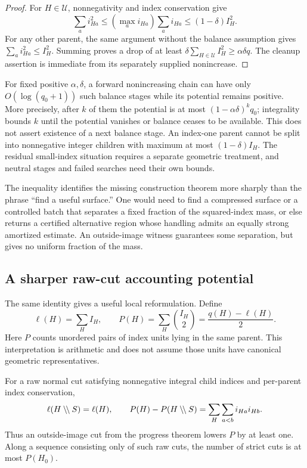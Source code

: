 \begin{proof}
For $H\in\mathcal U$, nonnegativity and index conservation give
\[
 \sum_a i_{Ha}^2\le (\max_a i_{Ha})\sum_a i_{Ha}
 \le(1-\delta)I_H^2.
\]
For any other parent, the same argument without the balance assumption
gives $\sum_a i_{Ha}^2\le I_H^2$. Summing proves a drop of at least
$\delta\sum_{H\in\mathcal U}I_H^2\ge\alpha\delta q$. The cleanup
assertion is immediate from its separately supplied nonincrease.
\end{proof}

For fixed positive $\alpha,\delta$, a forward nonincreasing chain can have
only $O(\log(q_0+1))$ such balance stages while its potential remains
positive. More precisely, after $k$ of them the potential is at most
$(1-\alpha\delta)^kq_0$; integrality bounds $k$ until the potential
vanishes or balance ceases to be available. This does not assert existence
of a next balance stage. An index-one parent cannot be split into
nonnegative integer children with maximum at most $(1-\delta)I_H$.
The residual small-index situation requires a separate geometric treatment,
and neutral stages and failed searches need their own bounds.

The inequality identifies the missing construction theorem more sharply
than the phrase ``find a useful surface.'' One would need to find a
compressed surface or a controlled batch that separates a fixed fraction
of the squared-index mass, or else returns a certified alternative region
whose handling admits an equally strong amortized estimate. An
outside-image witness guarantees some separation, but gives no uniform
fraction of the mass.

\subsection{A sharper raw-cut accounting potential}

The same identity gives a useful local reformulation. Define
\[
 \ell(H)=\sum_H I_H,\qquad
 P(H)=\sum_H\binom{I_H}{2}=\frac{q(H)-\ell(H)}{2}.
\]
Here $P$ counts unordered pairs of index units lying in the same parent.
This interpretation is arithmetic and does not assume those units have
canonical geometric representatives.

\begin{proposition}
\label{prop:pair-potential}
For a raw normal cut satisfying nonnegative integral child indices and
per-parent index conservation,
\[
 \ell(H\mathbin{\backslash\!\backslash} S)=\ell(H),\qquad
 P(H)-P(H\mathbin{\backslash\!\backslash} S)=\sum_H\sum_{a<b}i_{Ha}i_{Hb}.
\]
Thus an outside-image cut from the progress theorem lowers $P$ by at least
one. Along a sequence consisting only of such raw cuts, the number of
strict cuts is at most $P(H_0)$.
\end{proposition}

